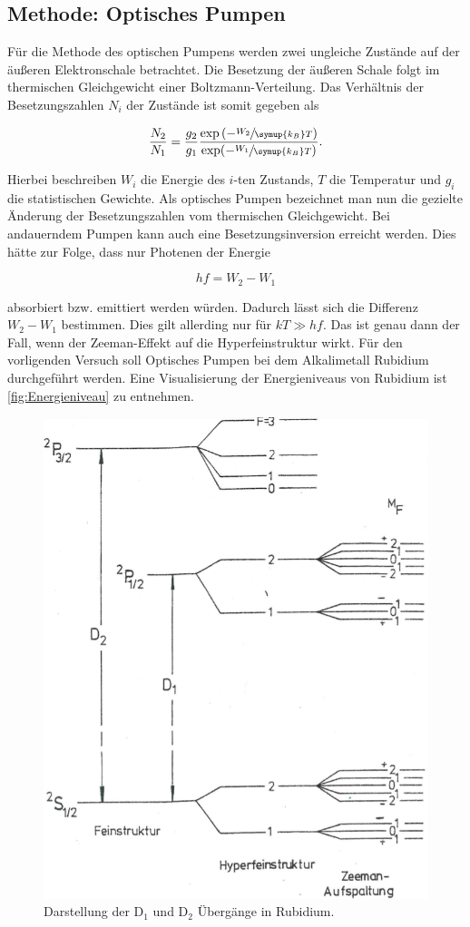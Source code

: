 \subsection{Methode: Optisches Pumpen}
\label{subsec:OptPumpen}

Für die Methode des optischen Pumpens werden zwei ungleiche Zustände auf der äußeren Elektronschale betrachtet. Die Besetzung der äußeren Schale folgt im thermischen
Gleichgewicht einer Boltzmann-Verteilung. Das Verhältnis der Besetzungszahlen $N_i$ der Zustände ist somit gegeben als

\begin{equation}
  \frac{N_2}{N_1}=\frac{g_2}{g_1}\frac{\exp\left(-\sfrac{W_2}{\symup{k_B}T}\right)}{\exp(-\sfrac{W_1}{\symup{k_B}T})}.
  \label{eq:thermisch}
\end{equation}

\noindent
Hierbei beschreiben $W_i$ die Energie des $i$-ten Zustands, $T$ die Temperatur und $g_i$ die statistischen Gewichte.
\newline
Als optisches Pumpen bezeichnet man nun die gezielte Änderung der Besetzungszahlen vom thermischen Gleichgewicht. Bei andauerndem Pumpen kann auch eine Besetzungsinversion
erreicht werden. Dies hätte zur Folge, dass nur Photenen der Energie

\begin{equation}
    hf = W_2 - W_1
\end{equation}

\noindent
absorbiert bzw. emittiert werden würden. Dadurch lässt sich die Differenz $W_2 - W_1$ bestimmen. Dies gilt allerding nur für $kT \gg hf$. Das ist genau dann der Fall,
wenn der Zeeman-Effekt auf die Hyperfeinstruktur wirkt.
\newline \newline
Für den vorligenden Versuch soll Optisches Pumpen bei dem Alkalimetall Rubidium durchgeführt werden. Eine Visualisierung der Energieniveaus von Rubidium ist \autoref{fig:Energieniveau}
zu entnehmen.


\begin{figure}[H]
	\centering
	\includegraphics[width=0.6\linewidth]{data/Niveau.png}
	\caption{Darstellung der D$_1$ und D$_2$ Übergänge in Rubidium.}
	\label{fig:Energieniveau}
\end{figure}


